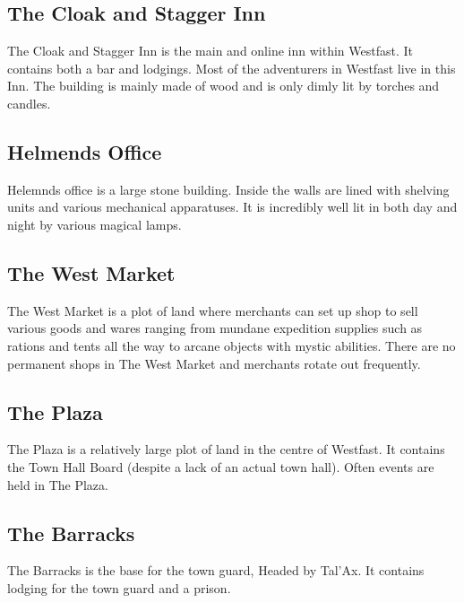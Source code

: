 \subsection{The Cloak and Stagger Inn}
The Cloak and Stagger Inn is the main and online inn within Westfast. It contains both a bar and lodgings. Most of the adventurers in Westfast live in this Inn. The building is mainly made of wood and is only dimly lit by torches and candles.
\subsection{Helmends Office}
Helemnds office is a large stone building. Inside the walls are lined with shelving units and various mechanical apparatuses. It is incredibly well lit in both day and night by various magical lamps.
\subsection{The West Market}
The West Market is a plot of land where merchants can set up shop to sell various goods and wares ranging from mundane expedition supplies such as rations and tents all the way to arcane objects with mystic abilities. There are no permanent shops in The West Market and merchants rotate out frequently.
\subsection{The Plaza}
The Plaza is a relatively large plot of land in the centre of Westfast. It contains the Town Hall Board (despite a lack of an actual town hall). Often events are held in The Plaza.
\subsection{The Barracks}
The Barracks is the base for the town guard, Headed by Tal'Ax. It contains lodging for the town guard and a prison.

